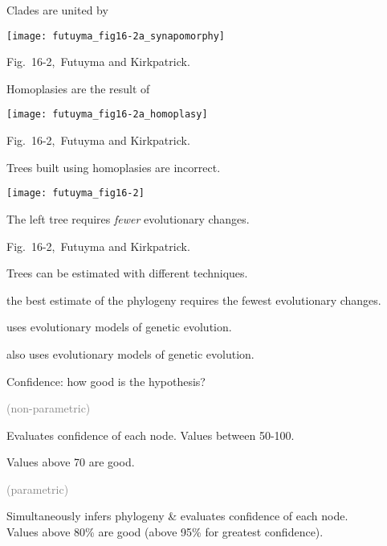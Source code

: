 \documentclass[t,handout]{beamer}  %
\begin{document}
\begin{frame}[t,plain]{Clades are united by }
	
	\centering
	
	\texttt{[image: futuyma\_fig16-2a\_synapomorphy]}
	
\vfilll

\tiny \hfill Fig.~16-2, \textcopyright\,Futuyma and Kirkpatrick.
\end{frame}
%
\begin{frame}[t,plain]{Homoplasies are the result of }

	\centering

	\texttt{[image: futuyma\_fig16-2a\_homoplasy]}

	\vfilll

	\tiny \hfill Fig.~16-2, \textcopyright\,Futuyma and Kirkpatrick.
\end{frame}
%
%
\begin{frame}[t,plain]{Trees built using homoplasies are incorrect.}

\texttt{[image: futuyma\_fig16-2]}

\hangpara The left tree requires \emph{fewer} evolutionary changes.

\vfilll

\tiny \hfill Fig.~16-2, \textcopyright\,Futuyma and Kirkpatrick.
\end{frame}
%
%
\begin{frame}[t,plain]{Trees can be estimated with different techniques.}

\hangpara {} the best estimate of the phylogeny requires the fewest evolutionary changes.

\hangpara {} uses evolutionary models of genetic evolution.

\hangpara {} also uses evolutionary models of genetic evolution.

\end{frame}
%
\begin{frame}[t,plain]{Confidence: how good is the hypothesis?}

\hangpara {} \textcolor{gray}{(non-parametric)} 

\quad Evaluates confidence of each node.
Values between 50-100.\\  

\smallskip

\quad Values above 70 are good.

\hangpara {} \textcolor{gray}{(parametric)} 

\quad Simultaneously infers phylogeny \& evaluates confidence of each node.
\\

\quad Values above 80\% are good (above 95\% for greatest confidence).

\end{frame}
\end{document}
